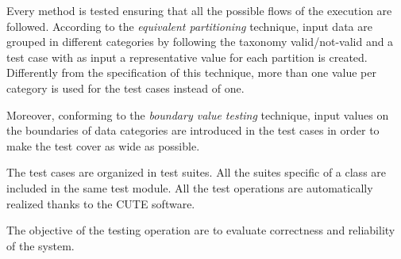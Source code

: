 	Every method is tested ensuring that all the possible flows of the execution are followed.
	According to the \emph{equivalent partitioning} technique, input data are grouped in different categories by following the taxonomy valid/not-valid and a test case with as input a representative value for each partition is created. 
	Differently from the specification of this technique, more than one value per category is used for the test cases instead of one.

	Moreover, conforming to the \emph{boundary value testing} technique, input values on the boundaries of data categories are introduced in the test cases in order to make the test cover as wide as possible. 

	The test cases are organized in test suites. All the suites specific of a class are included in the same test module. 
	All the test operations are automatically realized thanks to the CUTE software.

	The objective of the testing operation are to evaluate correctness and reliability of the system.



